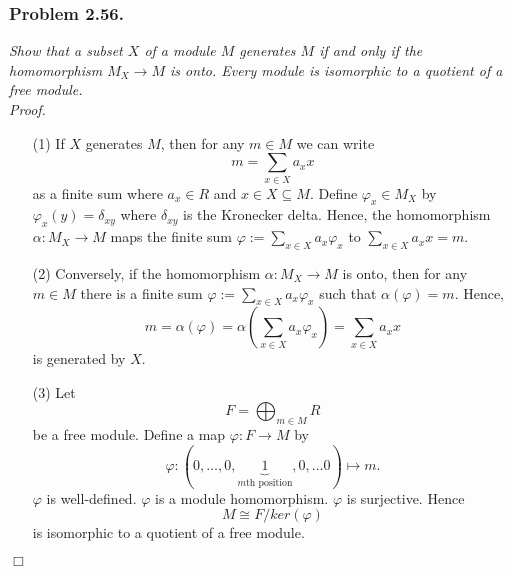 \documentclass{article}
\begin{document}



\subsubsection*{Problem 2.56.}
\emph{Show that a subset $X$ of a module $M$ generates $M$ if and only if
the homomorphism $M_X \to M$ is onto.
Every module is isomorphic to a quotient of a free module.} \\



\emph{Proof.}
\begin{enumerate}
\item[(1)]
  If $X$ generates $M$, then for any $m \in M$
  we can write
  \[
    m = \sum_{x \in X} a_{x} x
  \]
  as a finite sum where $a_{x} \in R$ and $x \in X \subseteq M$.
  Define $\varphi_{x} \in M_X$ by $\varphi_{x}(y) = \delta_{xy}$ where
  $\delta_{xy}$ is the Kronecker delta.
  Hence, the homomorphism $\alpha: M_X \to M$ maps
  the finite sum $\varphi := \sum_{x \in X} a_x \varphi_{x}$ to
  $\sum_{x \in X} a_{x} x = m$.

\item[(2)]
  Conversely, if the homomorphism $\alpha: M_X \to M$ is onto,
  then for any $m \in M$ there is a finite sum $\varphi := \sum_{x \in X} a_x \varphi_{x}$
  such that $\alpha(\varphi) = m$.
  Hence,
  \[
    m
    = \alpha(\varphi)
    = \alpha\left( \sum_{x \in X} a_x \varphi_{x} \right)
    = \sum_{x \in X} a_x x
  \]
  is generated by $X$.

\item[(3)]
  Let
  \[
    F = \bigoplus_{m \in M} R
  \]
  be a free module.
  Define a map $\varphi: F \to M$ by
  \[
    \varphi:
    (0, \ldots, 0, \underbrace{1}_{\text{$m$th position}}, 0, \ldots 0)
    \mapsto m.
  \]
  $\varphi$ is well-defined.
  $\varphi$ is a module homomorphism.
  $\varphi$ is surjective.
  Hence
  \[
    M \cong F/ker(\varphi)
  \]
  is isomorphic to a quotient of a free module.
\end{enumerate}
$\Box$ \\\\



\end{document}

